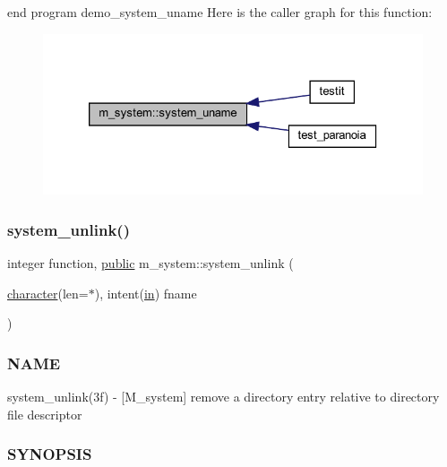 end program demo\+\_\+system\+\_\+uname Here is the caller graph for this function\+:
\nopagebreak
\begin{figure}[H]
\begin{center}
\leavevmode
\includegraphics[width=326pt]{namespacem__system_a04e5d49509c44bcb2ccabfd80ec8cdfb_icgraph}
\end{center}
\end{figure}
\mbox{\label{namespacem__system_a14ce0b9177815bc357dbdf3778687bb7}} 
\subsubsection{\texorpdfstring{system\+\_\+unlink()}{system\_unlink()}}
{\footnotesize\ttfamily integer function, \hyperlink{M__stopwatch_83_8txt_a2f74811300c361e53b430611a7d1769f}{public} m\+\_\+system\+::system\+\_\+unlink (\begin{DoxyParamCaption}\item[{\hyperlink{option__stopwatch_83_8txt_abd4b21fbbd175834027b5224bfe97e66}{character}(len=$\ast$), intent(\hyperlink{M__journal_83_8txt_afce72651d1eed785a2132bee863b2f38}{in})}]{fname }\end{DoxyParamCaption})}



\subsubsection*{N\+A\+ME}

system\+\_\+unlink(3f) -\/ \mbox{[}M\+\_\+system\mbox{]} remove a directory entry relative to directory file descriptor 

\subsubsection*{S\+Y\+N\+O\+P\+S\+IS}

